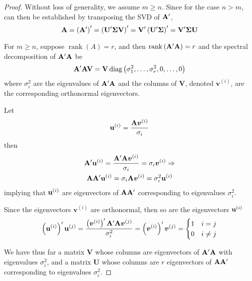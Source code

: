 \begin{proof}
	Without loss of generality, we assume $m\geq n$. Since for the case $n>m$, can then be established by transposing the SVD of ${\bf A}^{\prime}$,
	\begin{equation*}
		{\bf A}=\left({\bf A}^{\prime}\right)^{\prime}=\left(\mathbf{U}^{\prime}\boldsymbol{\Sigma}\mathbf{V}\right)^{\prime}=\mathbf{V}^{\prime}\left(\mathbf{U}^{\prime}\boldsymbol{\Sigma}\right)^{\prime}=\mathbf{V}^{\prime}\boldsymbol{\Sigma}\mathbf{U}
	\end{equation*}

	For $m\geq n$, suppose $\operatorname{rank}(A)=r$, and then $\operatorname{rank}\left({\bf A}^{\prime}{\bf A}\right)=r$ and the spectral decomposition of ${\bf A}^{\prime}{\bf A}$ be
	\begin{equation*}
		{\bf A}^{\prime}{\bf A}\mathbf{V}=\mathbf{V}\operatorname{diag}\left(\sigma_{1}^{2},\ldots,\sigma_{r}^{2},0,\ldots,0\right)
	\end{equation*}
	where $\sigma_{i}^{2}$ are the eigenvalues of ${\bf A}^{\prime}{\bf A}$ and the columns of $\mathbf{V}$, denoted $\boldsymbol{v}^{(i)}$, are the corresponding orthonormal eigenvectors.

	Let
	\begin{equation*}
		{\bf u}^{(i)}=\frac{{\bf A}\boldsymbol{v}^{(i)}}{\sigma_{i}}
	\end{equation*}
	then
	\begin{gather*}
		{\bf A}^{\prime}{\bf u}^{(i)}=\frac{{\bf A}^{\prime}{\bf A}\boldsymbol{v}^{(i)}}{\sigma_{i}}=\sigma_{i}\boldsymbol{v}^{(i)}\Rightarrow                       \\
		{\bf A}{\bf A}^{\prime}{\bf u}^{(i)}=\sigma_{i}{\bf A}\boldsymbol{v}^{(i)}=\sigma_{i}^{2}{\bf u}^{(i)}
	\end{gather*}
	implying that ${\bf u}^{(i)}$ are eigenvectors of ${\bf A}{\bf A}^{\prime}$ corresponding to eigenvalues $\sigma_{i}^{2}$.

	Since the eigenvectors $\boldsymbol{v}^{(i)}$ are orthonormal, then so are the eigenvectors ${\bf u}^{(i)}$
	\begin{equation*}
		\left({\bf u}^{(i)}\right)^{\prime}{\bf u}^{(j)}=\frac{\left(\boldsymbol{v}^{(i)}\right)^{\prime}{\bf A}^{\prime}{\bf A}\boldsymbol{v}^{(j)}}{\sigma_{i}^{2}}=\left(\boldsymbol{v}^{(i)}\right)^{\prime}\boldsymbol{v}^{(j)}=\begin{cases}1 & i=j \\ 0 & i \neq j\end{cases}
	\end{equation*}

	We have thus far a matrix $\mathbf{V}$ whose columns are eigenvectors of ${\bf A}^{\prime}{\bf A}$ with eigenvalues $\sigma_{i}^{2}$, and a matrix $\mathbf{U}$ whose columns are $r$ eigenvectors of ${\bf A}{\bf A}^{\prime}$ corresponding to eigenvalues $\sigma_{i}^{2}$.


\end{proof}
